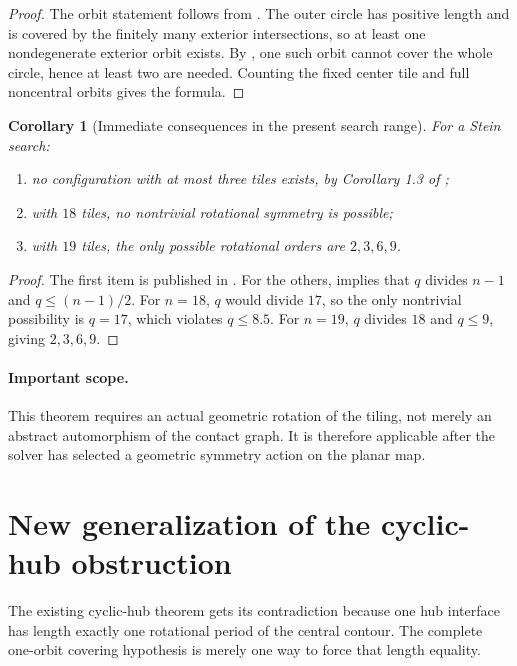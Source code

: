 \documentclass[11pt]{article}
\newtheorem{corollary}[theorem]{Corollary}
\theoremstyle{definition}
\theoremstyle{remark}
\begin{document}
\begin{proof}
The orbit statement follows from .  The outer circle has positive length and is covered by the finitely many exterior intersections, so at least one nondegenerate exterior orbit exists.  By , one such orbit cannot cover the whole circle, hence at least two are needed.  Counting the fixed center tile and full noncentral orbits gives the formula.
\end{proof}

\begin{corollary}[Immediate consequences in the present search range]
For a Stein search:
\begin{enumerate}
\item no configuration with at most three tiles exists, by Corollary 1.3 of \cite{KLV2020};
\item with $18$ tiles, no nontrivial rotational symmetry is possible;
\item with $19$ tiles, the only possible rotational orders are $2,3,6,9$.
\end{enumerate}
\end{corollary}

\begin{proof}
The first item is published in \cite{KLV2020}.  For the others,  implies that $q$ divides $n-1$ and $q\le(n-1)/2$.  For $n=18$, $q$ would divide $17$, so the only nontrivial possibility is $q=17$, which violates $q\le8.5$.  For $n=19$, $q$ divides $18$ and $q\le9$, giving $2,3,6,9$.
\end{proof}

\paragraph{Important scope.}
This theorem requires an actual geometric rotation of the tiling, not merely an abstract automorphism of the contact graph.  It is therefore applicable after the solver has selected a geometric symmetry action on the planar map.

\section{New generalization of the cyclic-hub obstruction}
\label{sec:period-interface}

The existing cyclic-hub theorem gets its contradiction because one hub interface has length exactly one rotational period of the central contour.  The complete one-orbit covering hypothesis is merely one way to force that length equality.
\end{document}
